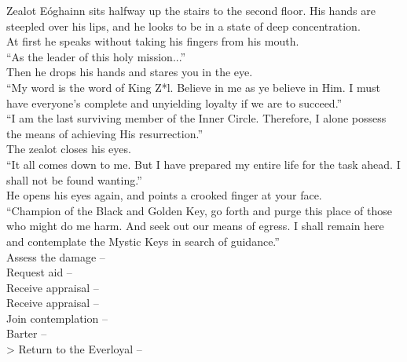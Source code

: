 Zealot Eóghainn sits halfway up the stairs to the second floor. His hands are steepled over his lips, and he looks to be in a state of deep concentration.\\

At first he speaks without taking his fingers from his mouth.\\
“As the leader of this holy mission...”\\

Then he drops his hands and stares you in the eye.\\
“My word is the word of King Z*l. Believe in me as ye believe in Him. I must have everyone’s complete and unyielding loyalty if we are to succeed.”\\

“I am the last surviving member of the Inner Circle. Therefore, I alone possess the means of achieving His resurrection.”\\

The zealot closes his eyes.\\
“It all comes down to me. But I have prepared my entire life for the task ahead. I shall not be found wanting.”\\

He opens his eyes again, and points a crooked finger at your face.\\
“Champion of the Black and Golden Key, go forth and purge this place of those who might do me harm. And seek out our means of egress. I shall remain here and contemplate the Mystic Keys in search of guidance.”\\

 Assess the damage -- \\
 Request aid -- \\
 Receive appraisal -- \\
 Receive appraisal -- \\
 Join contemplation -- \\
 Barter -- \\
> Return to the Everloyal -- 